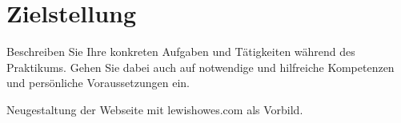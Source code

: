 
\chapter{Zielstellung}

Beschreiben Sie Ihre konkreten Aufgaben und Tätigkeiten während des Praktikums. Gehen Sie dabei auch auf notwendige und hilfreiche Kompetenzen und persönliche Voraussetzungen ein.

Neugestaltung der Webseite mit lewishowes.com als Vorbild.